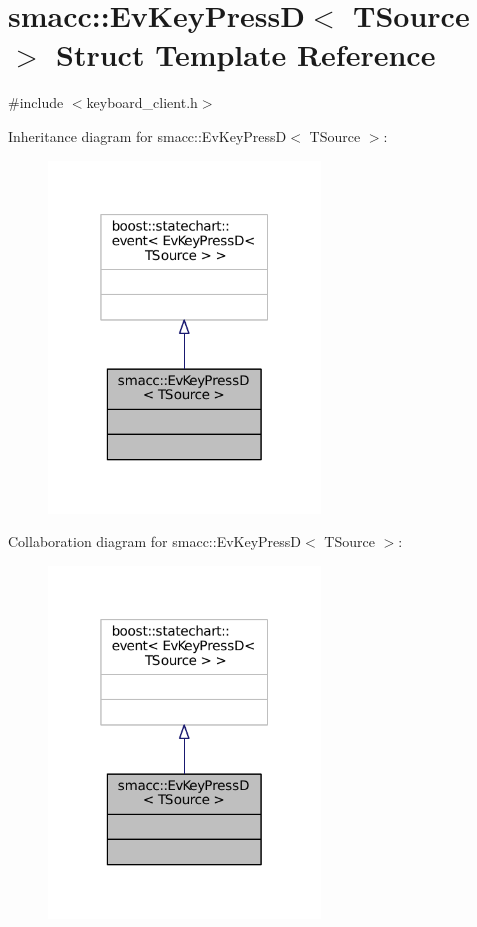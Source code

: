 \hypertarget{structsmacc_1_1EvKeyPressD}{}\section{smacc\+:\+:Ev\+Key\+PressD$<$ T\+Source $>$ Struct Template Reference}
\label{structsmacc_1_1EvKeyPressD}


{\ttfamily \#include $<$keyboard\+\_\+client.\+h$>$}



Inheritance diagram for smacc\+:\+:Ev\+Key\+PressD$<$ T\+Source $>$\+:
\nopagebreak
\begin{figure}[H]
\begin{center}
\leavevmode
\includegraphics[width=205pt]{structsmacc_1_1EvKeyPressD__inherit__graph}
\end{center}
\end{figure}


Collaboration diagram for smacc\+:\+:Ev\+Key\+PressD$<$ T\+Source $>$\+:
\nopagebreak
\begin{figure}[H]
\begin{center}
\leavevmode
\includegraphics[width=205pt]{structsmacc_1_1EvKeyPressD__coll__graph}
\end{center}
\end{figure}


